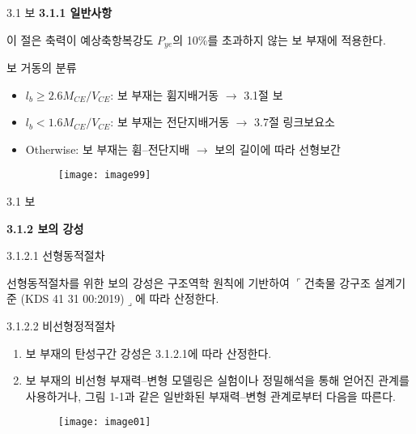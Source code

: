 
	\begin{frame}{3.1 보}
\textbf{3.1.1 일반사항}

이 절은 축력이 예상축항복강도 $P_{ye}$의 10\%를 초과하지 않는 보 부재에 적용한다. 

\begin{block}{보 거동의 분류}
	\begin{itemize}
		\item $l_b \geq 2.6M_{CE}/V_{CE}$: 보 부재는 휨지배거동 $\rightarrow$ 3.1절 보
		\item $l_b < 1.6M_{CE}/V_{CE}$: 보 부재는 전단지배거동 $\rightarrow$ 3.7절 링크보요소
		\item Otherwise: 보 부재는 휨--전단지배 $\rightarrow$ 보의 길이에 따라 선형보간
	\begin{figure}
		\centering
		\texttt{[image: image99]}
	\end{figure}			
	\end{itemize}
\end{block}

	\end{frame}



	\begin{frame}{3.1 보}

	\textbf{3.1.2 보의 강성}

	3.1.2.1 선형동적절차

선형동적절차를 위한 보의 강성은 구조역학 원칙에 기반하여 $\ulcorner$건축물 강구조 설계기준 (KDS 41 31 00:2019)$\lrcorner$에 따라 산정한다. 
	
3.1.2.2 비선형정적절차

\begin{enumerate}
	\item[(1)] 보 부재의 탄성구간 강성은 3.1.2.1에 따라 산정한다. 
	\item[(2)] 보 부재의 비선형 부재력--변형 모델링은 실험이나 정밀해석을 통해 얻어진 관계를 사용하거나, 그림 1-1과 같은 일반화된 부재력--변형 관계로부터 다음을 따른다. 
	\begin{figure}
		\centering
		\texttt{[image: image01]}
	\end{figure}
\end{enumerate}
\end{frame}



